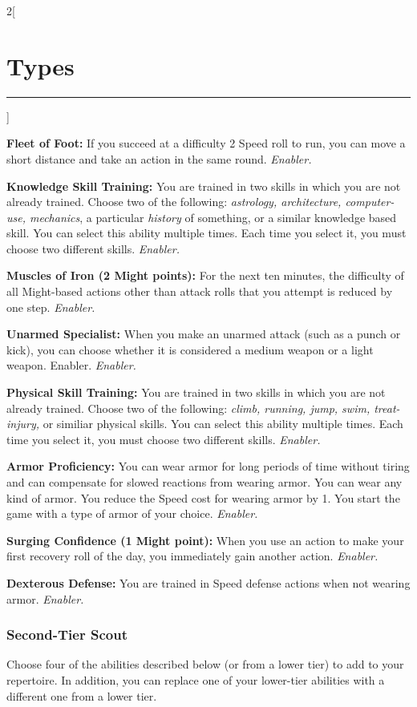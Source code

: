 \documentclass[a4paper,10pt,final]{book}
\newcommand{\HRule}{\rule{\linewidth}{0.5mm}} %
\newcommand{\newSection}[1]{\section*{#1} \addcontentsline{toc}{section}{#1} \label{sec:#1} \HRule}
\newcommand{\itemAbility}[2]{\textcolor{25gray}{\textbullet\textbf{ #1:}} {#2}\par}
\newcommand{\enabler}{\textit{ Enabler.}}
\newenvironment{docsection}[1]
{
  \begin{multicols*}{2}[\newSection{#1}]
}
{
  \end{multicols*}
  \newpage
}
\begin{document}
\begin{docsection}{Types}
\itemAbility{Fleet of Foot}{If you succeed at a difficulty 2 Speed roll to run, you can move a short distance and take an action in the same round.\enabler}

\itemAbility{Knowledge Skill Training}{You are trained in two skills in which you are not already trained. Choose two of the following: \textit{astrology, architecture, computer-use, mechanics}, a particular \textit{history} of something, or a similar knowledge based skill. You can select this ability multiple times. Each time you select it, you must choose two different skills.\enabler}

\itemAbility{Muscles of Iron (2 Might points)}{For the next ten minutes, the difficulty of all Might-based actions other than attack rolls that you attempt is reduced by one step.\enabler}

\itemAbility{Unarmed Specialist}{When you make an unarmed attack (such as a punch or kick), you can choose whether it is considered a medium weapon or a light weapon. Enabler.\enabler}

\itemAbility{Physical Skill Training}{You are trained in two skills in which you are not already trained. Choose two of the following: \textit{climb, running, jump, swim, treat-injury,} or similiar physical skills. You can select this ability multiple times. Each time you select it, you must choose two different skills.\enabler}

\itemAbility{Armor Proficiency}{You can wear armor for long periods of time without tiring and can compensate for slowed reactions from wearing armor. You can wear any kind of armor. You reduce the Speed cost for wearing armor by 1. You start the game with a type of armor of your choice.\enabler}

\itemAbility{Surging Confidence (1 Might point)}{When you use an action to make your first recovery roll of the day, you immediately gain another action.\enabler}

\itemAbility{Dexterous Defense}{You are trained in Speed defense actions when not wearing armor.\enabler}


\subsubsection*{Second-Tier Scout}
\label{subsub:scoutSecondTier}

Choose four of the abilities described
below (or from a lower tier) to add to your
repertoire. In addition, you can replace one
of your lower-tier abilities with a different
one from a lower tier.


\end{docsection}
\end{document}
